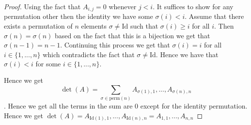 \documentclass[letter,12pt]{article}
\begin{document}
\begin{proof}
    Using the fact that $A_{i,j}=0$ whenever $j<i$. It suffices to show for any permutation other then the identity we have some $\sigma(i)<i$. 
    Assume that there exists a permutation of $n$ elements $\sigma\not = \text{Id}$ such that $\sigma(i)\geq i$ for all $i$. Then $\sigma(n)=\sigma(n)$ based on the fact that this is a bijection we get that $\sigma(n-1)=n-1$. Continuing this process we get that $\sigma(i)=i$ for all $i\in \{1,...,n\}$ which contradicts the fact that $\sigma\not = \text{Id}$. Hence we have that $\sigma(i)<i$ for some $i\in \{1,...,n\}$. 

    Hence we get $$\det(A)=\sum_{\sigma\in \text{perm}(n)}A_{\sigma(1),1},...,A_{\sigma(n),n}$$.
    Hence we get all the terms in the sum are $0$ except for the identity permutation. Hence we get $\det(A)=A_{\text{Id}(1),1},...,A_{\text{Id}(n),n}=A_{1,1},...,A_{n,n}$

\end{proof}
\end{document}

